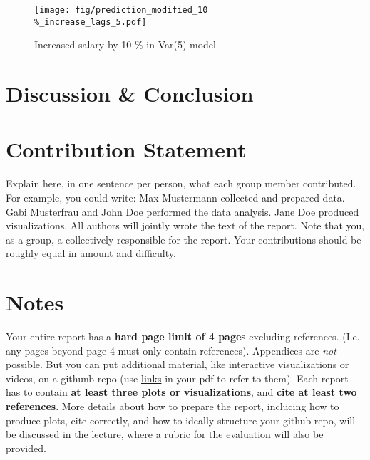 \documentclass{article}
\theoremstyle{plain}
\theoremstyle{definition}
\theoremstyle{remark}
\begin{document}
\begin{figure}[H]
    \centering
    \texttt{[image: fig/prediction\_modified\_10\\\%\_increase\_lags\_5.pdf]}
    \caption{Increased salary by 10 \% in Var(5) model}
\end{figure}






\section{Discussion \& Conclusion}\label{sec:conclusion}



\section*{Contribution Statement}

Explain here, in one sentence per person, what each group member contributed. For example, you could write: Max Mustermann collected and prepared data. Gabi Musterfrau and John Doe performed the data analysis. Jane Doe produced visualizations. All authors will jointly wrote the text of the report. Note that you, as a group, a collectively responsible for the report. Your contributions should be roughly equal in amount and difficulty.

\section*{Notes} 

Your entire report has a \textbf{hard page limit of 4 pages} excluding references. (I.e. any pages beyond page 4 must only contain references). Appendices are \emph{not} possible. But you can put additional material, like interactive visualizations or videos, on a githunb repo (use \href{https://github.com/pnkraemer/tueplots}{links} in your pdf to refer to them). Each report has to contain \textbf{at least three plots or visualizations}, and \textbf{cite at least two references}. More details about how to prepare the report, inclucing how to produce plots, cite correctly, and how to ideally structure your github repo, will be discussed in the lecture, where a rubric for the evaluation will also be provided.




\end{document}
